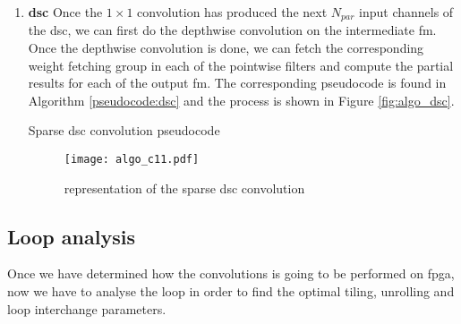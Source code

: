 \begin{enumerate}
\begin{figure}[H]
        \label{fig:algo_11conv}
    \end{figure}
    \item \textbf{\acrshort{dsc}} Once the $1 \times 1$ convolution has produced the next $N_{par}$ input channels of the \acrshort{dsc}, we can first do the depthwise convolution on the intermediate \acrshort{fm}. Once the depthwise convolution is done, we can fetch the corresponding weight fetching group in each of the pointwise filters and compute the partial results for each of the output \acrshort{fm}. The corresponding pseudocode is found in Algorithm \ref{pseudocode:dsc} and the process is shown in Figure \ref{fig:algo_dsc}.
    \begin{algorithm}[H]
        \centering
        \begin{algorithmic}
             
                 
                     
                         
                             
                            \EndFor
                        \EndFor
                    \EndFor
                \EndFor
            \EndFor
        \end{algorithmic}
        \caption{Sparse \acrshort{dsc} convolution pseudocode}
        \label{pseudocode:dsc}
    \end{algorithm}
    \begin{figure}[H]
        \centering
        \texttt{[image: algo\_c11.pdf]}
        \caption{representation of the sparse \acrshort{dsc} convolution}
        \label{fig:algo_11conv}
    \end{figure}
\end{enumerate}
%
\subsection{Loop analysis}
%
Once we have determined how the convolutions is going to be performed
on \acrshort{fpga}, now we have to analyse the loop in order to find the optimal tiling, unrolling and loop interchange parameters.